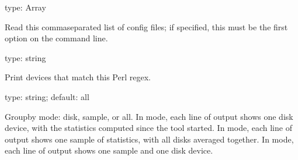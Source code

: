 \documentclass[letterpaper,10pt,english]{sphinxmanual}
\begin{document}
\begin{fulllineitems}
\label{\detokenize{mariadb-iostat:cmdoption-mariadb-iostat-config}}
\sphinxAtStartPar
type: Array

\sphinxAtStartPar
Read this comma\sphinxhyphen{}separated list of config files; if specified, this must be the
first option on the command line.

\end{fulllineitems}


\begin{fulllineitems}
\label{\detokenize{mariadb-iostat:cmdoption-mariadb-iostat-devices-regex}}
\sphinxAtStartPar
type: string

\sphinxAtStartPar
Print devices that match this Perl regex.

\end{fulllineitems}


\begin{fulllineitems}
\label{\detokenize{mariadb-iostat:cmdoption-mariadb-iostat-group-by}}
\sphinxAtStartPar
type: string; default: all

\sphinxAtStartPar
Group\sphinxhyphen{}by mode: disk, sample, or all.  In  mode, each line of output
shows one disk device, with the statistics computed since the tool started.  In
 mode, each line of output shows one sample of statistics, with all
disks averaged together.  In  mode, each line of output shows one sample
and one disk device.

\end{fulllineitems}
\end{document}

